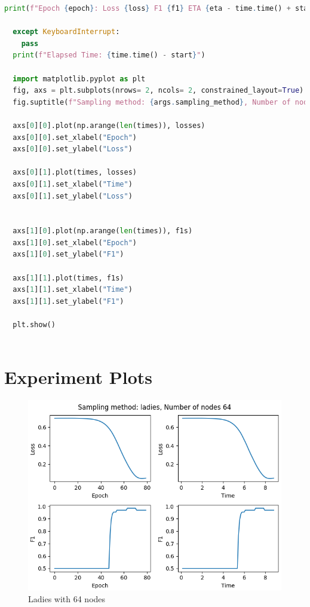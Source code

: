 \begin{lstlisting}[language=Python, caption= Training code, label=ls:train_code]
      print(f"Epoch {epoch}: Loss {loss} F1 {f1} ETA {eta - time.time() + start}s", flush= True)

  except KeyboardInterrupt:
    pass
  print(f"Elapsed Time: {time.time() - start}")

  import matplotlib.pyplot as plt
  fig, axs = plt.subplots(nrows= 2, ncols= 2, constrained_layout=True)
  fig.suptitle(f"Sampling method: {args.sampling_method}, Number of nodes {args.num_nodes}")
  
  axs[0][0].plot(np.arange(len(times)), losses)
  axs[0][0].set_xlabel("Epoch")
  axs[0][0].set_ylabel("Loss")

  axs[0][1].plot(times, losses)
  axs[0][1].set_xlabel("Time")
  axs[0][1].set_ylabel("Loss")


  axs[1][0].plot(np.arange(len(times)), f1s)
  axs[1][0].set_xlabel("Epoch")
  axs[1][0].set_ylabel("F1")

  axs[1][1].plot(times, f1s)
  axs[1][1].set_xlabel("Time")
  axs[1][1].set_ylabel("F1")

  plt.show()
  
\end{lstlisting}


\chapter{Experiment Plots}
\label{experiment_plots}

\begin{figure}[H]
    \centering
    \includegraphics[scale=0.8, ]{assets/plots/ladies_64.png}
    \caption{Ladies with 64 nodes} 
\end{figure}

